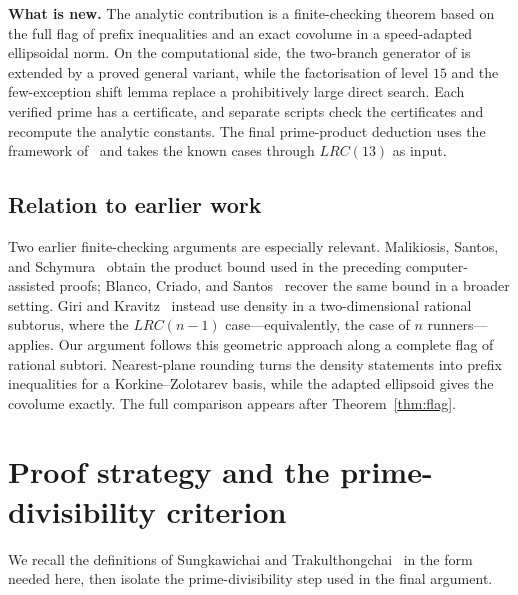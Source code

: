 \documentclass[11pt]{article}
\theoremstyle{definition}
\theoremstyle{remark}
\begin{document}
\medskip
\noindent\textbf{What is new.}
The analytic contribution is a finite-checking theorem based on the full
flag of prefix inequalities and an exact covolume in a speed-adapted
ellipsoidal norm.  On the computational side, the two-branch generator of
\cite{Allikvere26} is extended by a proved general variant, while the
factorisation of level $15$ and the few-exception shift lemma replace a
prohibitively large direct search.  Each verified prime has a certificate,
and separate scripts check the certificates and recompute the analytic
constants.  The final prime-product deduction uses the framework
of~\cite{ST26} and takes the known cases through $LRC(13)$ as input.

\subsection*{Relation to earlier work}

Two earlier finite-checking arguments are especially relevant.
Malikiosis, Santos, and Schymura~\cite{MSS25} obtain the product bound used
in the preceding computer-assisted proofs; Blanco, Criado, and
Santos~\cite{BCS26} recover the same bound in a broader setting.  Giri and
Kravitz~\cite{GK26} instead use density in a two-dimensional rational
subtorus, where the $LRC(n-1)$ case---equivalently, the case of $n$
runners---applies.  Our argument follows this geometric approach along a
complete flag of rational subtori.  Nearest-plane rounding turns the
density statements into prefix inequalities for a Korkine--Zolotarev
basis, while the adapted ellipsoid gives the covolume exactly.  The full
comparison appears after Theorem~\ref{thm:flag}.

\section{Proof strategy and the prime-divisibility criterion}\label{sec:framework}

We recall the definitions of Sungkawichai and
Trakulthongchai~\cite{ST26} in the form needed here, then isolate the
prime-divisibility step used in the final argument.
\end{document}
